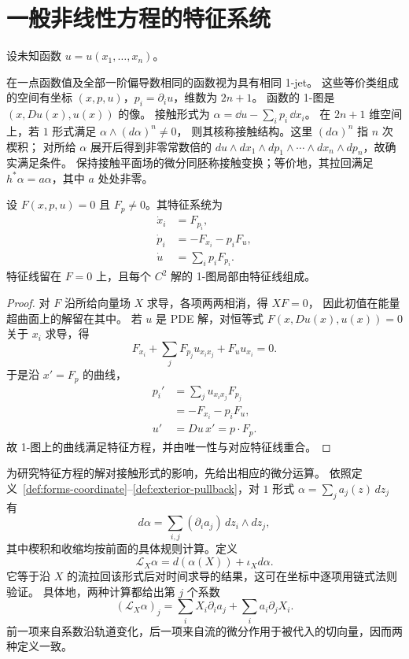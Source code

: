 \section{一般非线性方程的特征系统}
设未知函数 $u=u(x_1,\ldots,x_n)$。
\begin{definition}
在一点函数值及全部一阶偏导数相同的函数视为具有相同 1-jet。
这些等价类组成的空间有坐标 $(x,p,u)$，$p_i=\partial_i u$，维数为 $2n+1$。
函数的 1-图是 $(x,Du(x),u(x))$ 的像。
接触形式为 $\alpha=\dd u-\sum_i p_i\,\dd x_i$。
在 $2n+1$ 维空间上，若 $1$ 形式满足 $\alpha\wedge(d\alpha)^n\ne0$，
则其核称接触结构。这里 $(d\alpha)^n$ 指 $n$ 次楔积；
对所给 $\alpha$ 展开后得到非零常数倍的
$du\wedge dx_1\wedge dp_1\wedge\cdots\wedge dx_n\wedge dp_n$，故确实满足条件。
保持接触平面场的微分同胚称接触变换；等价地，其拉回满足 $h^*\alpha=a\alpha$，其中 $a$ 处处非零。
\end{definition}
\begin{theorem}[非线性特征方程]
设 $F(x,p,u)=0$ 且 $F_p\ne0$。其特征系统为
\[
 \begin{aligned}
 \dot x_i&=F_{p_i},\\
 \dot p_i&=-F_{x_i}-p_iF_u,\\
 \dot u&=\sum_i p_iF_{p_i}.
\end{aligned}
\]
特征线留在 $F=0$ 上，且每个 $C^2$ 解的 1-图局部由特征线组成。
\end{theorem}
\begin{proof}
对 $F$ 沿所给向量场 $X$ 求导，各项两两相消，得 $XF=0$，
因此初值在能量超曲面上的解留在其中。
若 $u$ 是 PDE 解，对恒等式 $F(x,Du(x),u(x))=0$ 关于 $x_i$ 求导，得
\[
 F_{x_i}+\sum_jF_{p_j}u_{x_ix_j}+F_u u_{x_i}=0.
\]
于是沿 $x'=F_p$ 的曲线，
\begin{align*}
 p_i'&=\sum_j u_{x_ix_j}F_{p_j}\\
 &=-F_{x_i}-p_iF_u,\\
 u'&=Du\,x'=p\cdot F_p.
\end{align*}
故 1-图上的曲线满足特征方程，并由唯一性与对应特征线重合。
\end{proof}
为研究特征方程的解对接触形式的影响，先给出相应的微分运算。
依照定义~\ref{def:forms-coordinate}--\ref{def:exterior-pullback}，对 $1$ 形式 $\alpha=\sum_j a_j(z)\,dz_j$ 有
\[
 d\alpha=\sum_{i,j}(\partial_i a_j)\,dz_i\wedge dz_j,
\]
其中楔积和收缩均按前面的具体规则计算。定义
\[
 \mathcal L_X\alpha=d(\alpha(X))+\iota_Xd\alpha.
\]
它等于沿 $X$ 的流拉回该形式后对时间求导的结果，这可在坐标中逐项用链式法则验证。
具体地，两种计算都给出第 $j$ 个系数
\[
 (\mathcal L_X\alpha)_j
 =\sum_iX_i\partial_i a_j+\sum_i a_i\partial_jX_i.
\]
前一项来自系数沿轨道变化，后一项来自流的微分作用于被代入的切向量，因而两种定义一致。

